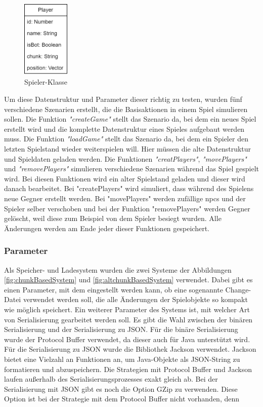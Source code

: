 \begin{figure}[htp]
    \centering
    \includegraphics[width=0.2\textwidth]{images/PlayerKlasse.png}
    \caption{Spieler-Klasse}
    \label{fig:playerClass}
\end{figure}

Um diese Datenstruktur und Parameter dieser richtig zu testen, wurden fünf verschiedene Szenarien erstellt, die die Basisaktionen in einem Spiel simulieren sollen. Die Funktion \textit{"createGame"} stellt das Szenario da, bei dem ein neues Spiel erstellt wird und die komplette Datenstruktur eines Spieles aufgebaut werden muss. Die Funktion \textit{"loadGame"} stellt das Szenario da, bei dem ein Spieler den letzten Spielstand wieder weiterspielen will. Hier müssen die alte Datenstruktur und Spieldaten geladen werden. Die Funktionen \textit{"creatPlayers"}, \textit{"movePlayers"} und \textit{"removePlayers"} simulieren verschiedene Szenarien während das Spiel gespielt wird. Bei diesen Funktionen wird ein alter Spielstand geladen und dieser wird danach bearbeitet. Bei "createPlayers" wird simuliert, dass während des Spielens neue Gegner erstellt werden. Bei "movePlayers" werden zufällige \acp{npc} und der Spieler selber verschoben und bei der Funktion "removePlayers" werden Gegner gelöscht, weil diese zum Beispiel von dem Spieler besiegt wurden. Alle Änderungen werden am Ende jeder dieser Funktionen gespeichert.  

\subsubsection{Parameter}
Als Speicher- und Ladesystem wurden die zwei Systeme der Abbildungen \ref{fig:chunkBasedSystem} und \ref{fig:altchunkBasedSystem} verwendet. Dabei gibt es einen Parameter, mit dem eingestellt werden kann, ob eine sogenannte Change-Datei verwendet werden soll, die alle Änderungen der Spielobjekte so kompakt wie möglich speichert. Ein weiterer Parameter des Systems ist, mit welcher Art von Serialisierung gearbeitet werden soll. Es gibt die Wahl zwischen der binären Serialisierung und der Serialisierung zu JSON. Für die binäre Serialisierung wurde der Protocol Buffer verwendet, da dieser auch für Java unterstützt wird. Für die Serialisierung zu JSON wurde die Bibliothek Jackson verwendet. Jackson bietet eine Vielzahl an Funktionen an, um Java-Objekte als JSON-String zu formatieren und abzuspeichern.\cite{githubGitHubFasterXMLjackson} Die Strategien mit Protocol Buffer und Jackson laufen außerhalb des Serialisierungsprozesses exakt gleich ab. Bei der Serialisierung mit JSON gibt es noch die Option GZip zu verwenden. Diese Option ist bei der Strategie mit dem Protocol Buffer nicht vorhanden, denn 

